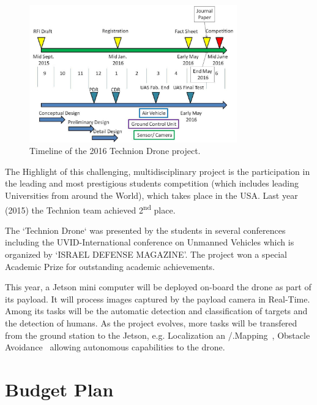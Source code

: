 \documentclass{article} %
\begin{document}
\begin{figure}[h]
	\centering
	\includegraphics[width=0.8\textwidth]{project_timeline}
	\caption{Timeline of the 2016 Technion Drone project.}
	\label{fig:drone}
\end{figure}
The Highlight of this challenging,
multidisciplinary project is the participation in the leading and most
prestigious students competition (which includes leading Universities from around
the World), which takes place in the USA. Last year (2015) the Technion team
achieved 2\textsuperscript{nd} place.

The `Technion Drone` was presented by the students in several conferences
including the UVID-International conference on Unmanned Vehicles which is
organized by `ISRAEL DEFENSE MAGAZINE'. The project won a special Academic Prize
for outstanding academic achievements.

This year, a Jetson mini computer will be deployed on-board the drone as part of
its payload. It will process images captured by the payload camera in Real-Time.
Among its tasks will be the automatic detection and classification of targets
and the detection of humans. As the project evolves, more tasks will be
transfered from the ground station to the Jetson, e.g. Localization an
/.Mapping~\cite{Nardi2014}, Obstacle Avoidance~\cite{Michels2005} allowing
autonomous capabilities to the drone.

\section{Budget Plan}
\end{document}
